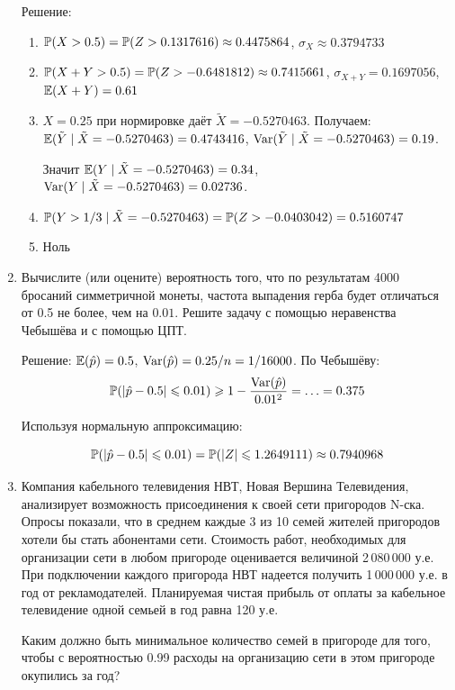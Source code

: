 \documentclass[12pt, a4paper]{article}\usepackage[]{graphicx}\usepackage[]{color}
\begin{document}
\begin{enumerate}
\begin{enumerate}
\end{enumerate}




Решение:
\begin{enumerate}
\item $\P(X>0.5)=\P(Z>0.1317616)\approx 0.4475864$, $\sigma_X\approx 0.3794733$
\item $\P(X+Y>0.5)=
\P(Z>-0.6481812)\approx 0.7415661$,
$\sigma_{X+Y}=0.1697056$, $\E(X+Y)=0.61$

\item $X=0.25$ при нормировке даёт $\tilde{X}=-0.5270463$. Получаем: $\E(\tilde{Y}\mid \tilde{X}=-0.5270463)=0.4743416$,  $\Var(\tilde{Y}\mid \tilde{X}=-0.5270463)=0.19$.

Значит $\E(Y \mid \tilde{X}=-0.5270463)=0.34$,  $\Var(Y\mid \tilde{X}=-0.5270463)=0.02736$.

\item $\P(Y>1/3\mid \tilde{X}=-0.5270463)=\P(Z>-0.0403042)=0.5160747$
\item Ноль
\end{enumerate}



\item Вычислите (или оцените) вероятность того, что по результатам 4000 бросаний симметричной монеты,  частота выпадения герба будет отличаться от 0.5 не более, чем на $0.01$. Решите задачу с помощью неравенства Чебышёва и с помощью ЦПТ.



Решение: $\E(\hat{p})=0.5$, $\Var(\hat{p})=0.25/n=1/16000$. По Чебышёву:
\[
\P(|\hat{p}-0.5|\leq 0.01)\geq 1-\frac{\Var(\hat{p})}{0.01^2}=\ldots=0.375
\]

Используя нормальную аппроксимацию:

\[
\P(|\hat{p}-0.5|\leq 0.01)=\P(|Z|\leq 1.2649111)\approx 0.7940968
\]


\item Компания кабельного телевидения НВТ, Новая Вершина Телевидения, анализирует возможность присоединения к своей сети пригородов N-ска. Опросы показали, что в среднем каждые 3 из 10 семей жителей пригородов хотели бы стать абонентами сети. Стоимость работ, необходимых для организации сети в любом пригороде оценивается величиной 2\,080\,000 у.е. При подключении каждого пригорода НВТ надеется получить 1\,000\,000 у.е. в год от рекламодателей. Планируемая чистая прибыль от оплаты за кабельное телевидение одной семьей в год равна 120 у.е.

Каким должно быть минимальное количество семей в пригороде для того, чтобы с вероятностью 0.99 расходы на организацию сети в этом пригороде окупились за год?



\end{enumerate}
\end{document}
